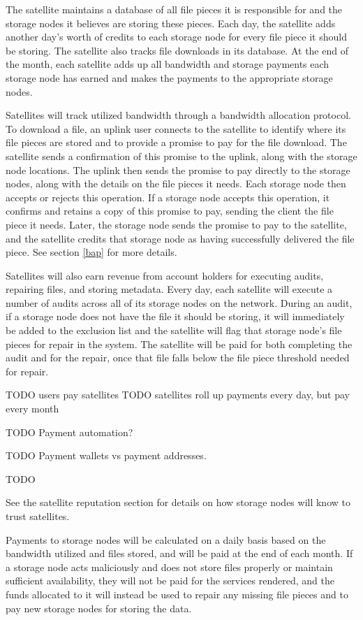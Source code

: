 \documentclass[11pt,fleqn,openany]{book}
\newcommand{\todo}[1]{{\color{red} TODO #1 }}
\begin{document}
The satellite maintains a database of all file pieces it is responsible for
and the storage nodes it believes are storing these pieces. Each day,
the satellite adds another day's worth
of credits to each storage node for every file
piece
it should be storing. The satellite
also tracks file downloads in its database.
At the end of the month, each satellite
adds up all bandwidth and storage payments each storage node has earned and
makes
the payments to the appropriate storage nodes.

Satellites will track utilized bandwidth through a bandwidth allocation
protocol. To download a file, an uplink user connects to the satellite to
identify where its file pieces are stored and to provide a promise to pay for
the file download. The satellite sends a confirmation of this promise
to the uplink, along with the storage node locations.
The uplink then sends the promise to pay directly
to the storage nodes, along with the details on the file pieces it needs.
Each storage node then accepts or rejects this operation.
If a storage node accepts this
operation, it confirms and retains a copy of this promise to pay, sending the
client the file piece it needs. Later, the storage node sends the promise to
pay to
the satellite, and the satellite credits that storage node as having
successfully delivered the file piece. See section \ref{bap} for more details.

Satellites will also earn revenue from account holders for executing audits,
repairing files, and storing metadata. Every day, each satellite will execute
a number of audits across all of its storage nodes on the network. During an
audit,
if a storage node does not have the file it should be storing, it will
immediately be added to the exclusion list and
the satellite will flag that storage node's file pieces for
repair
in the system.
The satellite will be paid for both completing the audit
and for the repair,
once that file falls below the file piece threshold needed for
repair.

\todo{users pay satellites}
\todo{satellites roll up payments every day, but pay every month}

\todo{Payment automation?}

\todo{Payment wallets vs payment addresses. }

\todo{}

See the satellite reputation section for details on
how storage nodes will know to trust satellites.

Payments to storage nodes will be calculated on a daily basis based on the
bandwidth
utilized and files stored, and will be paid at the end of each month.
If a storage node acts
maliciously and does not store files properly or maintain sufficient
availability, they will not be paid for the services rendered, and the funds
allocated to it will instead be used to repair any missing
file pieces and to pay new storage nodes for storing the data.
\end{document}
